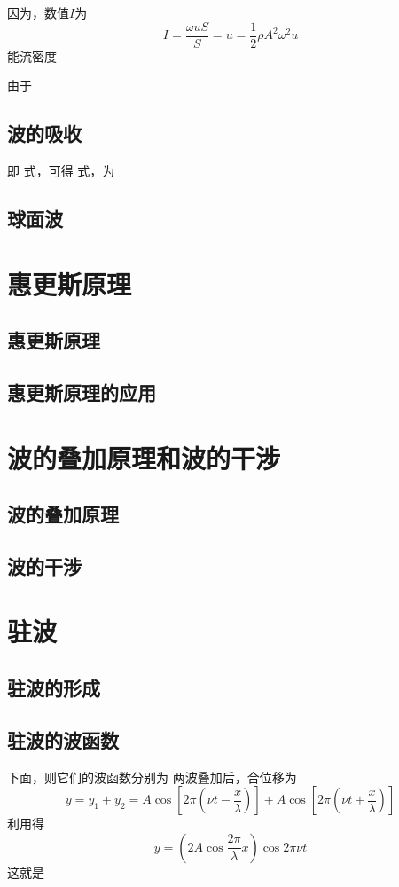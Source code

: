     因为，数值$I$为
    \[
    I=\frac{\omega uS}{S}=u=\frac{1}{2}\rho A^2\omega^2 u
    \]
    能流密度

    由于
    \subsection{波的吸收}
    即
    式，可得
    式，为
    \subsection{球面波}

\section{惠更斯原理}
    \subsection{惠更斯原理}
    \subsection{惠更斯原理的应用}

\section{波的叠加原理和波的干涉}
    \subsection{波的叠加原理}
    \subsection{波的干涉}

\section{驻波}
    \subsection{驻波的形成}
    \subsection{驻波的波函数}
    下面，则它们的波函数分别为
    两波叠加后，合位移为
    \[
    y=y_1+y_2=A\cos\left[2\pi\left(\nu t-\frac{x}{\lambda}\right)\right]+A\cos\left[2\pi\left(\nu t+\frac{x}{\lambda}\right)\right]
    \]
    利用得
    \[
    y=\left(2A\cos{\frac{2\pi}{\lambda}x}\right)\cos{2\pi \nu t}
    \]
    这就是

